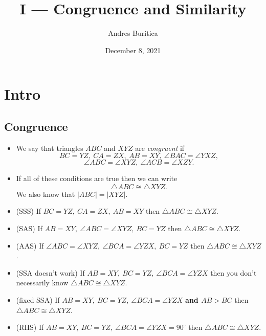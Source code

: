 \documentclass{article}
\title{I --- Congruence and Similarity}
\author{Andres Buritica}
\date{December 8, 2021}
\begin{document}
\maketitle
\section{Intro}
  \subsection{Congruence}
    \begin{itemize}
      \item We say that triangles $ABC$ and $XYZ$ are \emph{congruent} if \[BC=YZ,\ CA=ZX,\
      AB=XY,\ \angle BAC=\angle YXZ,\]
      \[\angle ABC=\angle XYZ,\ \angle ACB=\angle XZY.\]

    \item If all of these conditions are true then we can write \[\triangle
      ABC\cong\triangle XYZ.\] We also know that $|ABC| = |XYZ|$.
      
    \item (SSS) If $BC=YZ,\ CA=ZX,\ AB=XY$ then $\triangle ABC\cong\triangle XYZ$.
    \item (SAS) If $AB=XY,\ \angle ABC=\angle XYZ,\ BC=YZ$ then $\triangle
      ABC\cong\triangle XYZ$.
    \item (AAS) If $\angle ABC=\angle XYZ,\ \angle BCA=\angle YZX,\ BC=YZ$ then $\triangle
      ABC\cong\triangle XYZ$.
    \item (SSA doesn't work) If $AB=XY,\ BC=YZ,\ \angle BCA=\angle YZX$ then you don't necessarily know
      $\triangle ABC\cong\triangle XYZ$.
    \item (fixed SSA) If $AB=XY,\ BC=YZ,\ \angle BCA=\angle YZX$ \textbf{and $AB>BC$} then
      $\triangle ABC\cong\triangle XYZ$.
    \item (RHS) If $AB=XY,\ BC=YZ,\ \angle BCA=\angle YZX=90^\circ$ then $\triangle
      ABC\cong\triangle XYZ$.
  \end{itemize}
\end{document}
